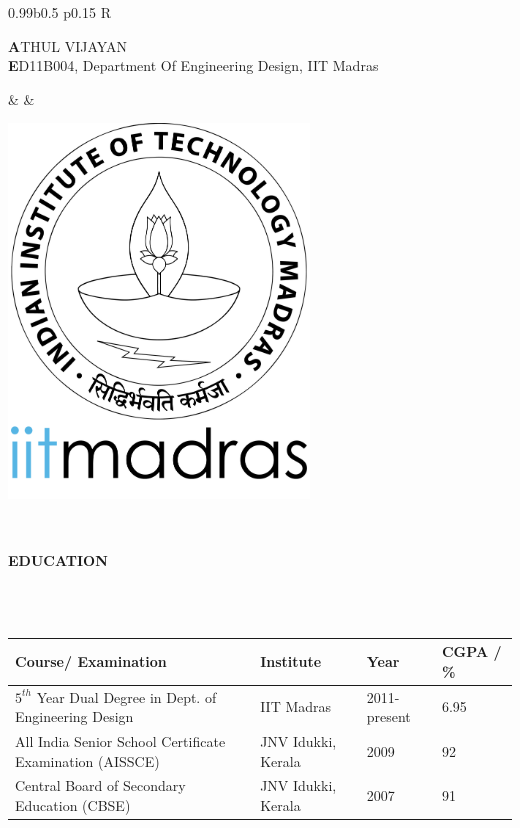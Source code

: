 \documentclass[a4paper,10pt]{article}
\newcommand{\lsep}{-0.5cm}
\newcommand{\resheading}[1]{{\small \colorbox{mygrey}{\begin{minipage}{0.975\textwidth}{\textbf{#1 \vphantom{p\^{E}}}}\end{minipage}}}}
\begin{document}

\indent
\begin{tabularx}{0.99\textwidth}{b{} p{} R}
    \specialrule{.05em}{1em}{0em}
    \begin{minipage}{\textwidth}
    \vspace{10pt}
        {\fontsize{12pt}{1em}\selectfont \textbf ATHUL VIJAYAN} \\
        { \textbf ED11B004, Department Of Engineering Design, IIT Madras}
    \end{minipage} & &
    \begin{minipage}[l]{.1\textwidth}%
        \vspace{3pt}
        \includegraphics[width=0.6\textwidth]{../iitmlogo.png}
    \end{minipage}\\

    \specialrule{.1em}{.05em}{.05em}
\end{tabularx}

\resheading{\textbf{EDUCATION} }\\[\lsep]
    \\

    \indent \begin{tabularx}{0.97\textwidth}{ X  p{3.4cm}  p{2.3cm} p{2cm} }
    \hline
    \textbf{Course/ Examination} & \textbf{Institute} & \textbf{Year} & \textbf{CGPA / \%} \\
    \hline
    $5^{th}$ Year Dual Degree in Dept. of Engineering Design & IIT Madras & 2011-present & 6.95\\
    All India Senior School Certificate Examination (AISSCE) & JNV Idukki, Kerala & 2009 & 92\\
    Central Board of Secondary Education (CBSE) & JNV Idukki, Kerala & 2007 & 91\\
    \hline
    \end{tabularx}
    \\
\end{document}
